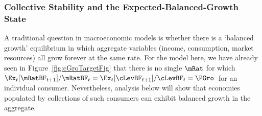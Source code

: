 \documentclass[BufferStockTheory]{subfiles}
\begin{document}
 \begin{comment}
 The full proof is in Appendix~\ref{sec:ApndxMTargetIsStable}, but the key points can be made informally here.  Existence of such a point is guaranteed by
 \begin{enumerate}
 \item Existence, continuity, and monotonicity of $\Ex_t [{\mRat}_{t+1}-\mRat_t]$
 \item $\lim_{\mRat_{t}\downarrow 0} \Ex_t [{\mRat}_{t+1}/\mRat_t] > 1 > \lim_{\mRat_{t}\uparrow \infty} \Ex_t [{\mRat}_{t+1}/\mRat_t]$
\item The intermediate value theorem
\end{enumerate}
 \begin{align}
   \bar{\Rnorm}(1-\usual{\cFunc}^{\prime}(\mTrg)) & = 1 \\
   (1-\usual{\cFunc}^{\prime}(\mTrg)) & = \bar{\Rnorm}^{-1} \\
 \end{align}

 The fact (cf.\~\eqref{eq:MinMPCDef}) that the minimum value of $\usual{\cFunc}^{\prime}$ is $1-\PatR$ converts~\eqref{eq:mTargDerImplicit} to the inequality $1-\bar{\Rnorm}^{-1} > 1-\PatR$ from which we have
 \begin{align}
      \PGroAdj/\Rfree & > \Pat/\Rfree \notag
\\    1 & > \Pat/\PGroAdj
 \end{align}
 which is the {\GICNrm}; thus, if a stable point exists, it must satisfy the {\GICNrm}.  (The appendix proves that if the {\GICNrm} is satisfied, such a point must exist, and be globally stable).
\end{comment}

 \hypertarget{Collective-Stability}{}
 \subsubsection{Collective Stability and the Expected-Balanced-Growth State}\label{subsubsec:mSteadyState}
 A traditional question in macroeconomic models is whether there is a `balanced growth' equilibrium in which aggregate variables (income, consumption, market resources) all grow forever at the same rate.  For the model here, we have already seen in Figure~\ref{fig:cGroTargetFig} that there is no single $\mRat$ for which $\Ex_{t}[\mRatBF_{t+1}]/\mRatBF_{t} = \Ex_{t}[\cLevBF_{t+1}]/\cLevBF_{t} = \PGro$~for an individual consumer.  Nevertheless, analysis below will show that economies populated by collections of such consumers can exhibit balanced growth in the aggregate.
\end{document}
